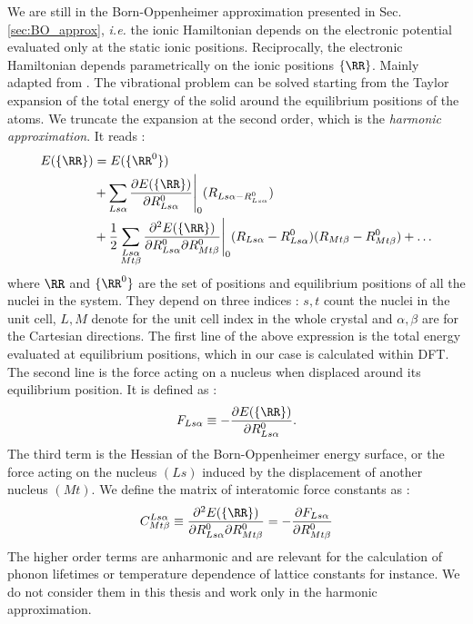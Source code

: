 We are still in the Born-Oppenheimer approximation presented in Sec. \ref{sec:BO_approx}, \textit{i.e.} the ionic Hamiltonian depends on the electronic potential evaluated only at the static ionic positions. Reciprocally, the electronic Hamiltonian depends parametrically on the ionic positions $\{\RR\}$.
Mainly adapted from \cite{baroni2001phonons,pereira2017ab,paleari2019first}. The vibrational problem can be solved starting from the Taylor expansion of the total energy of the solid around the equilibrium positions of the atoms. We truncate the expansion at the second order, which is the \textit{harmonic approximation}. It reads :
\begin{align}
\begin{split}
	E(\{\RR\}) &=  E(\{\RR^0\}) \\ 
	&+ \sum_{Ls\alpha} \frac{\partial E(\{\RR\})}{\partial R^0_{Ls\alpha}}\Biggr|_{0} (R_{Ls\alpha - R^0_{Ls\alpha}}) \\
	&+ \frac{1}{2} \sum_{\substack{Ls\alpha \\ Mt\beta}} \frac{\partial^2 E(\{\RR\})}{\partial R^0_{Ls\alpha} \partial R^0_{Mt\beta}}\Biggr|_{0} (R_{Ls\alpha} - R^0_{Ls\alpha}) (R_{Mt\beta} - R^0_{Mt\beta}) + \ldots
\end{split}
\end{align}
where ${\RR}$ and $\{\RR^0\}$ are the set of positions and equilibrium positions of all the nuclei in the system. They depend on three indices : $s,t$ count the nuclei in the unit cell, $L,M$ denote for the unit cell index in the whole crystal and $\alpha,\beta$ are for the Cartesian directions. The first line of the above expression is the total energy evaluated at equilibrium positions, which in our case is calculated within \gls{DFT}. The second line is the force acting on a nucleus when displaced around its equilibrium position. It is defined as :
\begin{equation}
	F_{Ls\alpha} \equiv -\frac{\partial E(\{ \RR\})}{\partial R^0_{Ls\alpha}}.
\end{equation}
The third term is the Hessian of the Born-Oppenheimer energy surface, or the force acting on the nucleus $(Ls)$ induced by the displacement of another nucleus $(Mt)$. We define the matrix of interatomic force constants as :
\begin{equation}
	C^{Ls\alpha}_{Mt\beta} \equiv \frac{\partial^2 E(\{\RR\})}{\partial R^0_{Ls\alpha} \partial R^0_{Mt\beta}} = -\frac{\partial F_{Ls\alpha}}{\partial R^0_{Mt\beta}}
	\label{eq:IFC_matrix}
\end{equation}
The higher order terms are anharmonic and are relevant for the calculation of phonon lifetimes or temperature dependence of lattice constants for instance. We do not consider them in this thesis and work only in the harmonic approximation.

